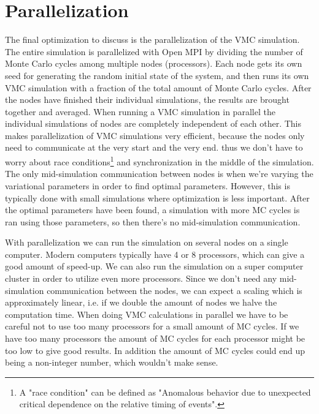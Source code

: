 \documentclass[../main.tex]{subfiles}
\begin{document}
\section{Parallelization}\label{sec:Parallel}

The final optimization to discuss is the parallelization of the VMC simulation. The entire simulation is parallelized with Open MPI by dividing the number of Monte Carlo cycles among multiple nodes (processors). Each node gets its own seed for generating the random initial state of the system, and then runs its own VMC simulation with a fraction of the total amount of Monte Carlo cycles. After the nodes have finished their individual simulations, the results are brought together and averaged. When running a VMC simulation in parallel the individual simulations of nodes are completely independent of each other. This makes parallelization of VMC simulations very efficient, because the nodes only need to communicate at the very start and the very end. thus we don't have to worry about race conditions\footnote{A "race condition" can be defined as "Anomalous behavior due to unexpected critical dependence on the relative timing of events".\cite{Wheeler}} and synchronization\cite{Blaise} in the middle of the simulation. The only mid-simulation communication between nodes is when we're varying the variational parameters in order to find optimal parameters. However, this is typically done with small simulations where optimization is less important. After the optimal parameters have been found, a simulation with more MC cycles is ran using those parameters, so then there's no mid-simulation communication. 

With parallelization we can run the simulation on several nodes on a single computer. Modern computers typically have 4 or 8 processors, which can give a good amount of speed-up. We can also run the simulation on a super computer cluster in order to utilize even more processors. Since we don't need any mid-simulation communication between the nodes, we can expect a scaling which is approximately linear, i.e. if we double the amount of nodes we halve the computation time. When doing VMC calculations in parallel we have to be careful not to use too many processors for a small amount of MC cycles. If we have too many processors the amount of MC cycles for each processor might be too low to give good results. In addition the amount of MC cycles could end up being a non-integer number, which wouldn't make sense.
\end{document}
